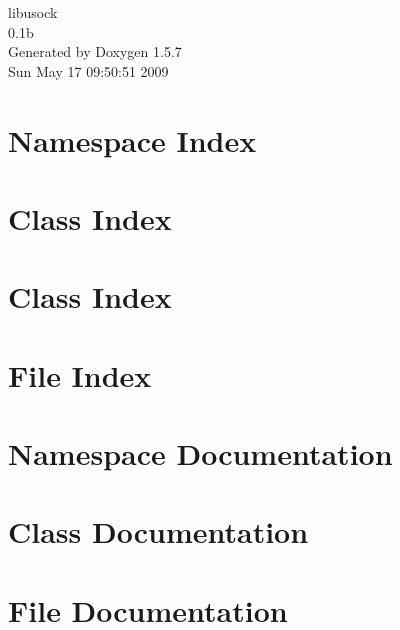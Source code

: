 \documentclass[a4paper]{book}
\begin{document}
\begin{titlepage}
\vspace*{7cm}
\begin{center}
{\Large libusock \\[1ex]\large 0.1b }\\
\vspace*{1cm}
{\large Generated by Doxygen 1.5.7}\\
\vspace*{0.5cm}
{\small Sun May 17 09:50:51 2009}\\
\end{center}
\end{titlepage}
\clearemptydoublepage
{}
\tableofcontents
\clearemptydoublepage
{}
\chapter{Namespace Index}

\chapter{Class Index}

\chapter{Class Index}

\chapter{File Index}

\chapter{Namespace Documentation}

\chapter{Class Documentation}






\chapter{File Documentation}


\printindex
\end{document}
